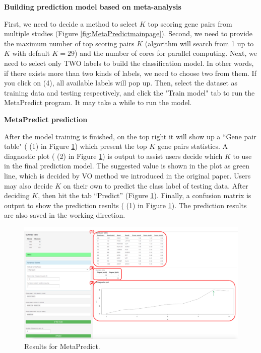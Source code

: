 \begin{steps}
\item \textbf{Building prediction model based on meta-analysis}

First, we need to decide a method to select $K$ top scoring gene pairs from multiple studies (Figure \ref{fig:MetaPredictmainpage}). 
Second, we need to provide the maximum number of top scoring pairs $K$ (algorithm will search from 1 up to $K$ with default $K = 29$) and the number of cores for parallel computing. 
Next, we need to select only TWO labels to build the classification model. 
In other words, if there exists more than two kinds of labels, we need to choose two from them. 
If you click on {\color{red} (4)}, all available labels will pop up.
Then, select the dataset as training data and testing respectively, 
and click the "Train model" tab to run the MetaPredict program. 
It may take a while to run the model.

\item \textbf{MetaPredict prediction}

After the model training is finished, on the top right it will show up a ``Gene pair table" ({\color{red} (1)} in Figure \ref{fig:MetaPredictresult}) which present the top $K$ gene pairs statistics. 
A diagnostic plot ({\color{red} (2)} in Figure \ref{fig:MetaPredictresult}) is output to assist users decide which $K$ to use in the final prediction model. 
The suggested value is shown in the plot as green line, which is decided by VO method we introduced in the original paper. Users may also decide $K$ on their own to predict the class label of testing data. 
After deciding $K$, then hit the tab ``Predict'' (Figure \ref{fig:MetaPredictresult}). 
Finally, a confusion matrix is output to show the prediction results ({\color{red} (1)} in Figure \ref{fig:MetaPredictresult}).
The prediction results are also saved in the working direction.

\begin{figure}[H]
\begin{center}
\includegraphics[scale=0.5]{./figure/MetaPredict/MetaPredictresult.pdf}
\caption{Results for MetaPredict.}
\label{fig:MetaPredictresult}
\end{center}
\end{figure}

\end{steps}

